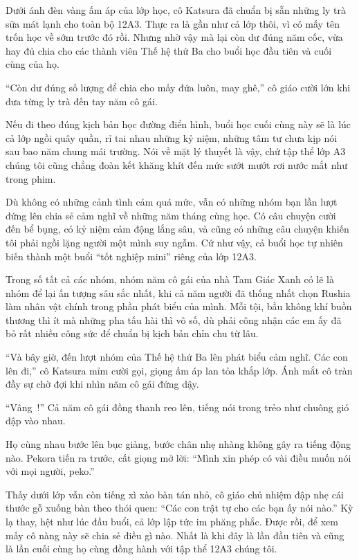 \documentclass[../main.tex]{subfiles}
\begin{document}
Dưới ánh đèn vàng ấm áp của lớp học, cô Katsura đã chuẩn bị sẵn những ly trà sữa mát lạnh cho toàn bộ 12A3. Thực ra là gần như cả lớp thôi, vì có mấy tên trốn học về sớm trước đó rồi. Nhưng nhờ vậy mà lại còn dư đúng năm cốc, vừa hay đủ chia cho các thành viên Thế hệ thứ Ba cho buổi học đầu tiên và cuối cùng của họ.

``Còn dư đúng số lượng để chia cho mấy đứa luôn, may ghê,'' cô giáo cười lớn khi đưa từng ly trà đến tay năm cô gái.

Nếu đi theo đúng kịch bản học đường điển hình, buổi học cuối cùng này sẽ là lúc cả lớp ngồi quây quần, rỉ tai nhau những kỷ niệm, những tâm tư chưa kịp nói sau bao năm chung mái trường. Nói về mặt lý thuyết là vậy, chứ tập thể lớp A3 chúng tôi cũng chẳng đoàn kết khăng khít đến mức sướt mướt rơi nước mắt như trong phim.

Dù không có những cảnh tình cảm quá mức, vẫn có những nhóm bạn lần lượt đứng lên chia sẻ cảm nghĩ về những năm tháng cùng học. Có câu chuyện cười đến bể bụng, có kỷ niệm cảm động lắng sâu, và cũng có những câu chuyện khiến tôi phải ngồi lặng người một mình suy ngẫm. Cứ như vậy, cả buổi học tự nhiên biến thành một buổi ``tốt nghiệp mini'' riêng của lớp 12A3.

Trong số tất cả các nhóm, nhóm năm cô gái của nhà Tam Giác Xanh có lẽ là nhóm để lại ấn tượng sâu sắc nhất, khi cả năm người đã thống nhất chọn Rushia làm nhân vật chính trong phần phát biểu của mình. Mỗi tội, bầu không khí buồn thương thì ít mà những pha tấu hài thì vô số, dù phải công nhận các em ấy đã bỏ rất nhiều công sức để chuẩn bị kịch bản chỉn chu từ lâu.

``Và bây giờ, đến lượt nhóm của Thế hệ thứ Ba lên phát biểu cảm nghĩ. Các con lên đi,'' cô Katsura mỉm cười gọi, giọng ấm áp lan tỏa khắp lớp. Ánh mắt cô tràn đầy sự chờ đợi khi nhìn năm cô gái đứng dậy.

``Vâng~!'' Cả năm cô gái đồng thanh reo lên, tiếng nói trong trẻo như chuông gió đập vào nhau.

Họ cùng nhau bước lên bục giảng, bước chân nhẹ nhàng không gây ra tiếng động nào. Pekora tiến ra trước, cất giọng mở lời: ``Mình xin phép có vài điều muốn nói với mọi người, peko.''

Thấy dưới lớp vẫn còn tiếng xì xào bàn tán nhỏ, cô giáo chủ nhiệm đập nhẹ cái thước gỗ xuống bàn theo thói quen: ``Các con trật tự cho các bạn ấy nói nào.'' Kỳ lạ thay, hệt như lúc đầu buổi, cả lớp lập tức im phăng phắc. Được rồi, để xem mấy cô nàng này sẽ chia sẻ điều gì nào. Nhất là khi đây là lần đầu tiên và cũng là lần cuối cùng họ cùng đồng hành với tập thể 12A3 chúng tôi.
\end{document}
